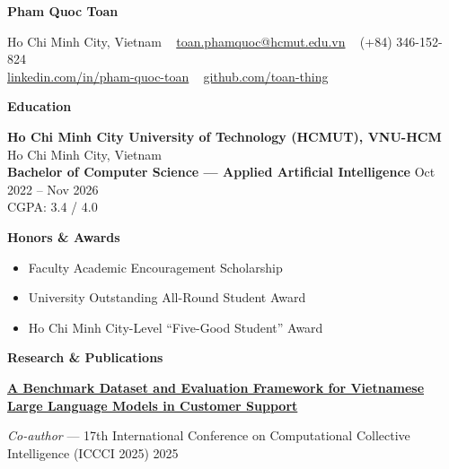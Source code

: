 \documentclass[10pt]{article}
\newcommand{\sep}{\textbullet\ }
\newcommand{\resumeSection}[1]{%
  \par\vspace{13pt}%
  {\centering\textbf{\large #1}\par}%
  \vspace{6pt}%
}
\newcommand{\resumeSubheading}[4]{%
  \textbf{#1} \hfill #2\\
  \textbf{#3} \hfill #4%
}
\begin{document}
\begin{center}
    \textbf{\LARGE Pham Quoc Toan}\\
    \vspace{4pt}
    \hrulefill
\end{center}

\begin{center}
    Ho Chi Minh City, Vietnam \sep
    \href{mailto:toan.phamquoc@hcmut.edu.vn}{toan.phamquoc@hcmut.edu.vn} \sep
    (+84) 346-152-824 \\
    \vspace{2pt}
    \href{https://www.linkedin.com/in/pham-quoc-toan}{linkedin.com/in/pham-quoc-toan} \sep
    \href{https://github.com/toan-thing}{github.com/toan-thing}
\end{center}

\resumeSection{Education}

\resumeSubheading
  {Ho Chi Minh City University of Technology (HCMUT), VNU-HCM}{Ho Chi Minh City, Vietnam}
  {Bachelor of Computer Science --- Applied Artificial Intelligence}{Oct 2022 -- Nov 2026}\\
CGPA: 3.4 / 4.0

\vspace{3pt}
\textbf{Honors \& Awards}
\begin{itemize}
    \item Faculty Academic Encouragement Scholarship
    \item University Outstanding All-Round Student Award
    \item Ho Chi Minh City-Level ``Five-Good Student'' Award
\end{itemize}

\resumeSection{Research \& Publications}

\textbf{\href{https://doi.org/10.1007/978-3-032-10202-7_33}
{A Benchmark Dataset and Evaluation Framework for Vietnamese Large Language Models in Customer Support}}

\textit{Co-author} --- 17th International Conference on Computational Collective Intelligence (ICCCI 2025)
\hfill 2025
\end{document}
